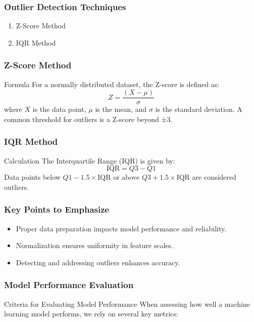 \documentclass[aspectratio=169]{beamer}
\begin{document}
\begin{frame}[fragile]
    \frametitle{Outlier Detection Techniques}
    \begin{enumerate}
        \item Z-Score Method
        \item IQR Method
    \end{enumerate}
\end{frame}

\begin{frame}[fragile]
    \frametitle{Z-Score Method}
    \begin{block}{Formula}
        For a normally distributed dataset, the Z-score is defined as:
        \begin{equation}
            Z = \frac{(X - \mu)}{\sigma}
        \end{equation}
        where \(X\) is the data point, \(\mu\) is the mean, and \(\sigma\) is the standard deviation. A common threshold for outliers is a Z-score beyond ±3.
    \end{block}
\end{frame}

\begin{frame}[fragile]
    \frametitle{IQR Method}
    \begin{block}{Calculation}
        The Interquartile Range (IQR) is given by:
        \begin{equation}
            \text{IQR} = Q3 - Q1
        \end{equation}
        Data points below \(Q1 - 1.5 \times \text{IQR}\) or above \(Q3 + 1.5 \times \text{IQR}\) are considered outliers.
    \end{block}
\end{frame}

\begin{frame}[fragile]
    \frametitle{Key Points to Emphasize}
    \begin{itemize}
        \item Proper data preparation impacts model performance and reliability.
        \item Normalization ensures uniformity in feature scales.
        \item Detecting and addressing outliers enhances accuracy.
    \end{itemize}
\end{frame}

\begin{frame}[fragile]
    \frametitle{Model Performance Evaluation}
    \begin{block}{Criteria for Evaluating Model Performance}
        When assessing how well a machine learning model performs, we rely on several key metrics:
    \end{block}
\end{frame}
\end{document}
